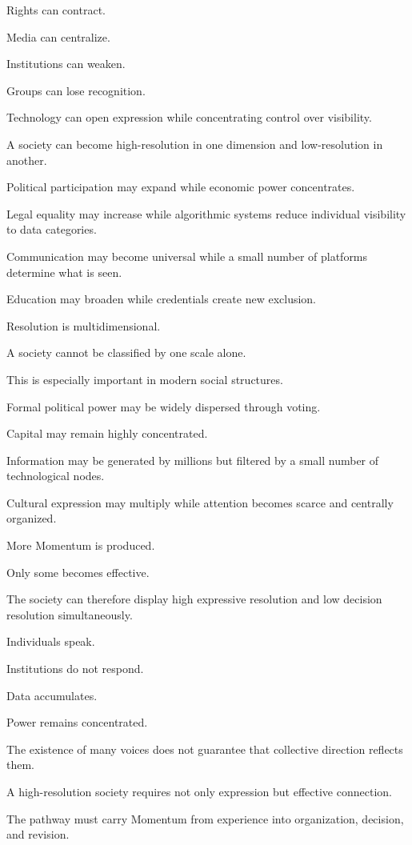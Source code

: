 Rights can contract.

Media can centralize.

Institutions can weaken.

Groups can lose recognition.

Technology can open expression while concentrating control over visibility.

A society can become high-resolution in one dimension and low-resolution in another.

Political participation may expand while economic power concentrates.

Legal equality may increase while algorithmic systems reduce individual visibility to data categories.

Communication may become universal while a small number of platforms determine what is seen.

Education may broaden while credentials create new exclusion.

Resolution is multidimensional.

A society cannot be classified by one scale alone.

This is especially important in modern social structures.

Formal political power may be widely dispersed through voting.

Capital may remain highly concentrated.

Information may be generated by millions but filtered by a small number of technological nodes.

Cultural expression may multiply while attention becomes scarce and centrally organized.

More Momentum is produced.

Only some becomes effective.

The society can therefore display high expressive resolution and low decision resolution simultaneously.

Individuals speak.

Institutions do not respond.

Data accumulates.

Power remains concentrated.

The existence of many voices does not guarantee that collective direction reflects them.

A high-resolution society requires not only expression but effective connection.

The pathway must carry Momentum from experience into organization, decision, and revision.

